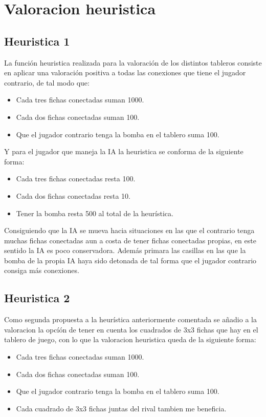 \section{Valoracion heuristica}
\label{sec:heuristica}

\subsection*{Heuristica 1}
	La función heuristica realizada para la valoración de los distintos tableros consiste en aplicar una valoración positiva a todas las conexiones que tiene el jugador contrario, de tal modo que:

	\begin{itemize}
		\item Cada tres fichas conectadas suman 1000.
		\item Cada dos fichas conectadas suman 100.
		\item Que el jugador contrario tenga la bomba en el tablero suma 100.
	\end{itemize}

	Y para el jugador que maneja la IA la heuristica se conforma de la siguiente forma:
	
	\begin{itemize}
		\item Cada tres fichas conectadas resta 100.
		\item Cada dos fichas conectadas resta 10.
		\item Tener la bomba resta 500 al total de la heurística.
	\end{itemize}

	Consiguiendo que la IA se mueva hacia situaciones en las que el contrario tenga muchas fichas conectadas aun a costa de tener fichas conectadas propias, en este sentido la IA es poco conservadora. Además primara las casillas en las que la bomba de la propia IA haya sido detonada de tal forma que el jugador contrario consiga más conexiones.

\subsection*{Heuristica 2}
	Como segunda propuesta a la heurística anteriormente comentada se añadio a la valoracion la opcíón de tener en cuenta los cuadrados de 3x3 fichas que hay en el tablero de juego, con lo que la valoracion heuristica queda de la siguiente forma:

	\begin{itemize}
		\item Cada tres fichas conectadas suman 1000.
		\item Cada dos fichas conectadas suman 100.
		\item Que el jugador contrario tenga la bomba en el tablero suma 100.
		\item Cada cuadrado de 3x3 fichas juntas del rival tambien me beneficia.
	\end{itemize}

